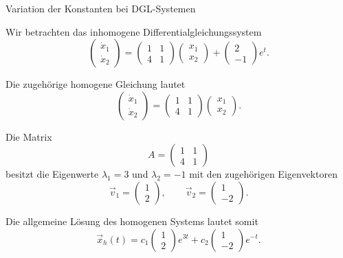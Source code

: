 \begin{bsp}{Variation der Konstanten bei DGL-Systemen}{}

    Wir betrachten das inhomogene Differentialgleichungssystem
    \[
        \begin{pmatrix}
            \dot{x}_1 \\
            \dot{x}_2
        \end{pmatrix}
        =
        \begin{pmatrix}
            1 & 1 \\
            4 & 1
        \end{pmatrix}
        \begin{pmatrix}
            x_1 \\
            x_2
        \end{pmatrix}
        +
        \begin{pmatrix}
            2 \\
            -1
        \end{pmatrix}e^t.
    \]

    Die zugehörige homogene Gleichung lautet
    \[
        \begin{pmatrix}
            \dot{x}_1 \\
            \dot{x}_2
        \end{pmatrix}
        =
        \begin{pmatrix}
            1 & 1 \\
            4 & 1
        \end{pmatrix}
        \begin{pmatrix}
            x_1 \\
            x_2
        \end{pmatrix}.
    \]

    Die Matrix
    \[
        A=\begin{pmatrix}
            1 & 1 \\
            4 & 1
        \end{pmatrix}
    \]
    besitzt die Eigenwerte \(\lambda_1=3\) und \(\lambda_2=-1\)
    mit den zugehörigen Eigenvektoren
    \[
        \vec{v}_1=\begin{pmatrix}1\\2\end{pmatrix},
        \qquad
        \vec{v}_2=\begin{pmatrix}1\\-2\end{pmatrix}.
    \]

    Die allgemeine Lösung des homogenen Systems lautet somit
    \[
        \vec{x}_h(t)
        =
        c_1\begin{pmatrix}1\\2\end{pmatrix}e^{3t}
        +
        c_2\begin{pmatrix}1\\-2\end{pmatrix}e^{-t}.
    \]


\end{bsp}

